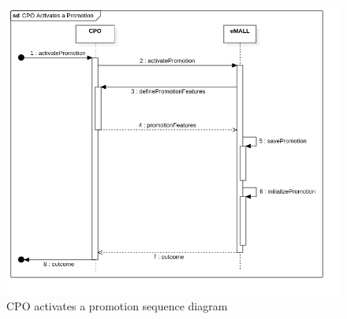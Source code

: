 \begin{center}
    \begin{figure} [H]
        \begin{center}
            \includegraphics[width=0.9\linewidth]{Images/SequenceDiagrams/cpo_activates_a_promotion}
            \caption{CPO activates a promotion sequence diagram}
            \label{fig: cpo_activate_promo_seq_diag}
        \end{center}
    \end{figure}
\end{center}

